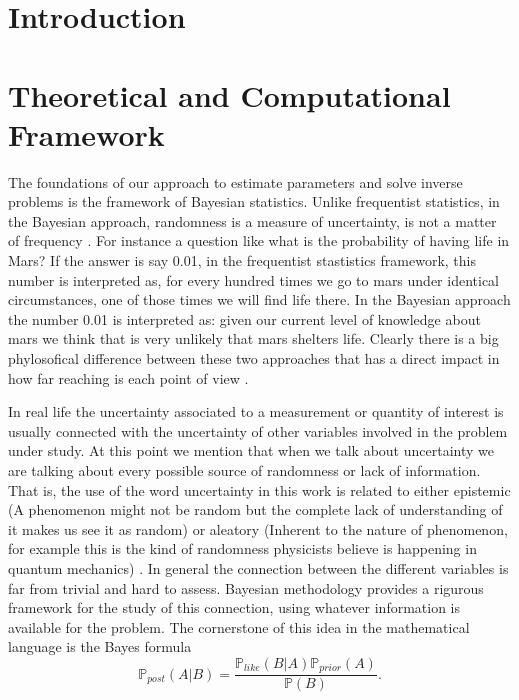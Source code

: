 \documentclass[12pt]{book}
\newcommand{\post}{\mathbb{P}_{post}}
\newcommand{\like}{\mathbb{P}_{like}}
\newcommand{\prior}{\mathbb{P}_{prior}}
\newcommand{\p}{\mathbb{P}}
\begin{document}
\chapter{Introduction}

\newpage

\chapter{Theoretical and Computational Framework}


The foundations of  our approach to estimate parameters and solve inverse problems is  the 
framework of Bayesian statistics. Unlike frequentist statistics, in the Bayesian approach, randomness
is a measure of uncertainty, is not a matter of frequency . For instance a question like
what is the probability of having  life in Mars? If the answer is say 0.01, in the frequentist
stastistics framework, this number is interpreted as, for every hundred times we go to 
mars under identical circumstances, one of those times we will find life there. In the Bayesian
approach the number 0.01 is interpreted as: given our current level of knowledge about mars
we think that is very unlikely that mars shelters life. Clearly there is a big phylosofical
difference between these two approaches that has a direct impact in how far reaching is each point of view  \cite{jaynes2003probability}.


In real life the uncertainty associated to a  measurement or  quantity of interest is usually 
connected  with the uncertainty  of other variables involved in the problem under study. 
At this point we mention that when we talk about uncertainty we are talking about every possible 
source of randomness  or  lack of information. That is, the use of the word uncertainty in this work
is related to either epistemic (A phenomenon might not be random but the complete lack of 
understanding of it makes us see it as random) or aleatory (Inherent to the nature of phenomenon, for 
example this is the kind of randomness physicists believe is happening in quantum mechanics)
\cite{kennedy2001bayesian}.
In general the connection between the different variables is far from trivial and hard to assess.
Bayesian methodology provides a rigurous framework for the study of 
this connection, using whatever information
is available for the problem. The cornerstone of this idea
in the mathematical language is the  Bayes formula 
\begin{equation}\label{eqnBayes}
\post(A|B)=\frac{\like(B|A)\prior(A)}{\p(B)}.
\end{equation}
\end{document}
